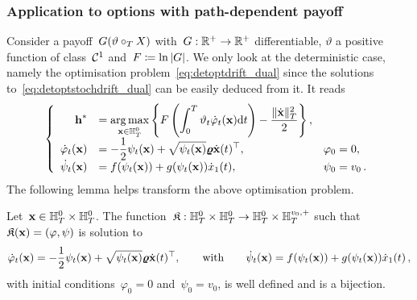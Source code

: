 \subsubsection{\textbf{Application to options with path-dependent payoff}}
\label{sec:PayoffPathDepG}
\sloppy Consider a payoff~$G(\vartheta\circ_{T} X)$ with~${G:\mathbb{R}^{+} \rightarrow \mathbb{R}^{+}}$ differentiable, 
$\vartheta$ a positive function of class~$\mathcal{C}^1$ and~$F \coloneqq \ln|G|$. 
We only look at the deterministic case, 
namely the optimisation problem~\eqref{eq:detoptdrift_dual} since the solutions to~\eqref{eq:detoptstochdrift_dual} can be easily deduced from it. It reads
\begin{equation*}
\left\{
\begin{array}{rll}
\boldsymbol{\mathrm{h}}^* & = \displaystyle \operatorname*{arg\,max}\limits_{\boldsymbol{\mathrm{x}}\in \mathbb{H}_T^0} 
\left\{F\left(\int_0^T\vartheta_t \dot{\varphi}_t(\boldsymbol{\mathrm{x}}) \mathrm{d} t\right) - \frac{\|\dot{\boldsymbol{\mathrm{x}}}\|_{T}^2}{2}\right\},\\
\dot{\varphi}_t(\boldsymbol{\mathrm{x}}) & = \displaystyle -\frac{1}{2}\psi_t(\boldsymbol{\mathrm{x}}) + \sqrt{\psi_t(\boldsymbol{\mathrm{x}})}\boldsymbol{\mathrm{\varrho}} \dot{\boldsymbol{\mathrm{x}}}(t)^\top, & \varphi_0 = 0,\\
\dot{\psi}_t(\boldsymbol{\mathrm{x}}) & = \displaystyle f(\psi_t(\boldsymbol{\mathrm{x}})) + g(\psi_t(\boldsymbol{\mathrm{x}})) \dot{x}_1(t), & \psi_0 = v_0\,.
\end{array}
\right.
\end{equation*}
The following lemma helps transform the above optimisation problem.
\begin{lemma}\label{lem:Simplify}
Let~$\boldsymbol{\mathrm{x}}\in \mathbb{H}_T^0 \times \mathbb{H}_T^0$. The function~$\mathfrak{K}:\mathbb{H}_T^0 \times \mathbb{H}_T^0 \rightarrow \mathbb{H}_T^0\times \mathbb{H}_T^{v_0,+}$ such that~$\mathfrak{K}(\boldsymbol{\mathrm{x}})=(\varphi,\psi)$ is solution to
$$
\dot{\varphi}_t(\boldsymbol{\mathrm{x}})  = -\frac{1}{2}\psi_t(\boldsymbol{\mathrm{x}}) + \sqrt{\psi_t(\boldsymbol{\mathrm{x}})}\boldsymbol{\mathrm{\varrho}} \dot{\boldsymbol{\mathrm{x}}}(t)^\top,
\qquad\text{with}\qquad
\dot{\psi}_t(\boldsymbol{\mathrm{x}}) = f(\psi_t(\boldsymbol{\mathrm{x}})) + g(\psi_t(\boldsymbol{\mathrm{x}})) \dot{x}_1(t)\,,
$$
with initial conditions~$\varphi_0 = 0$ and~$\psi_0 = v_0$, is well defined and is a bijection.
\end{lemma}
